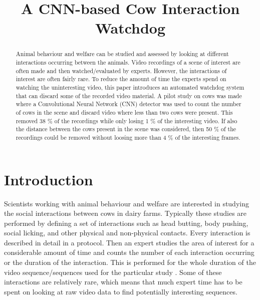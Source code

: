 \documentclass{cta-author}
\begin{document}
\title{A CNN-based Cow Interaction Watchdog}

\author{   }
\address{
}


\begin{abstract}
Animal behaviour and welfare can be studied and assessed by looking at different interactions occurring between the animals. Video recordings of a scene of interest are often made and then watched/evaluated by experts. However, the  interactions of interest are often fairly rare. To reduce the amount of time the experts spend on watching the uninteresting video, this paper introduces an automated watchdog system that can discard some of the recorded video material. A pilot study on cows was made where a Convolutional Neural Network (CNN) detector was used to count the number of cows in the scene and discard video where less than two cows were present. This removed 38 \% of the recordings while only losing 1 \% of the interesting video. If also the distance between the cows present in the scene was considered, then 50 \% of the recordings could be removed without loosing more than 4 \% of the interesting frames.
\end{abstract}

\maketitle

\section{Introduction}

Scientists working with animal behaviour and welfare are interested in studying the social interactions between cows in dairy farms. Typically these studies are performed by defining a set of interactions such as head butting, body pushing, social licking, and other physical and non-physical contacts. Every interaction is described in detail in a protocol. Then an expert studies the area of interest for a considerable amount of time and counts the number of each interaction occurring or the duration of the interaction. This is performed for the whole duration of the video sequence/sequences used for the particular study \cite{MartinandBateson2007}. Some of these interactions are relatively rare, which means that much expert time has to be spent on looking at raw video data to find potentially interesting sequences.
\end{document}
